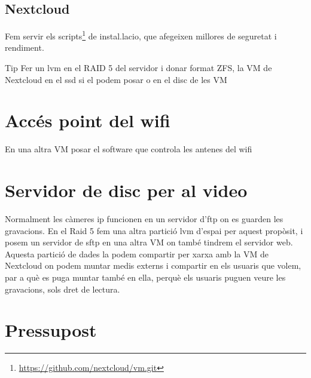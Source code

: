 \documentclass[
  10pt,
]{krantz}
\DeclareRobustCommand{\href}[2]{#2\footnote{\url{#1}}}
\begin{document}
\hypertarget{nextcloud-1}{%
\subsection{Nextcloud}\label{nextcloud-1}}

Fem servir els \href{https://github.com/nextcloud/vm.git}{scripts} de instal.lacio, que afegeixen millores de seguretat i rendiment.

\begin{rmdtip}{Tip}
Fer un lvm en el RAID 5 del servidor i donar format ZFS, la VM de Nextcloud en el ssd si el podem posar o en el disc de les VM

\end{rmdtip}

\hypertarget{accuxe9s-point-del-wifi}{%
\section{Accés point del wifi}\label{accuxe9s-point-del-wifi}}

En una altra VM posar el software que controla les antenes del wifi

\hypertarget{servidor-de-disc-per-al-video}{%
\section{Servidor de disc per al video}\label{servidor-de-disc-per-al-video}}

Normalment les càmeres ip funcionen en un servidor d'ftp on es guarden les gravacions. En el Raid 5 fem una altra partició lvm d'espai per aquest propòsit, i posem un servidor de sftp en una altra VM on també tindrem el servidor web. Aquesta partició de dades la podem compartir per xarxa amb la VM de Nextcloud on podem muntar medis externs i compartir en els usuaris que volem, par a què es puga muntar també en ella, perquè els usuaris puguen veure les gravacions, sols dret de lectura.

\hypertarget{pressupost-1}{%
\section{Pressupost}\label{pressupost-1}}
\end{document}
